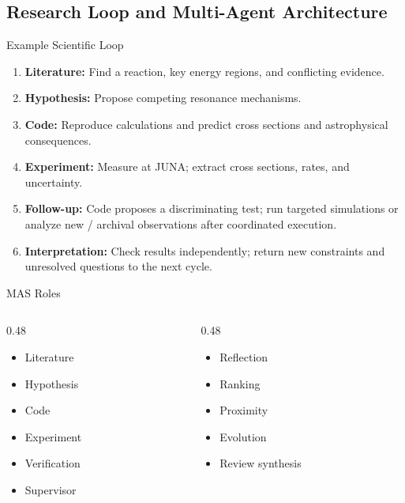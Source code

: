 \subsection{Research Loop and Multi-Agent Architecture}
\setsource{}
\begin{frame}[t,label=md-42]{Example Scientific Loop}
\label{md-62}
\small
{}
\smallskip
\begin{enumerate}
\setlength{\itemsep}{0.45em}
    \item \textbf{Literature:} Find a reaction, key energy regions, and conflicting evidence.
    \item \textbf{Hypothesis:} Propose competing resonance mechanisms.
    \item \textbf{Code:} Reproduce calculations and predict cross sections and astrophysical consequences.
    \item \textbf{Experiment:} Measure at JUNA; extract cross sections, rates, and uncertainty.
    \item \textbf{Follow-up:} Code proposes a discriminating test; run targeted
    simulations or analyze new / archival observations after coordinated execution.
    \item \textbf{Interpretation:} Check results independently; return new constraints and unresolved questions to the next cycle.
\end{enumerate}
\end{frame}

\begin{frame}[c,label=md-43]{MAS Roles}
\label{md-44}
\normalsize
\begin{columns}[T,onlytextwidth]
\begin{column}{0.48\textwidth}
\medskip
\begin{itemize}
\setlength{\itemsep}{0.7em}
    \item Literature
    \item Hypothesis
    \item Code
    \item Experiment
    \item Verification
    \item Supervisor
\end{itemize}
\end{column}
\begin{column}{0.48\textwidth}
\medskip
\begin{itemize}
\setlength{\itemsep}{0.7em}
    \item Reflection
    \item Ranking
    \item Proximity
    \item Evolution
    \item Review synthesis
\end{itemize}
\end{column}
\end{columns}
\end{frame}
